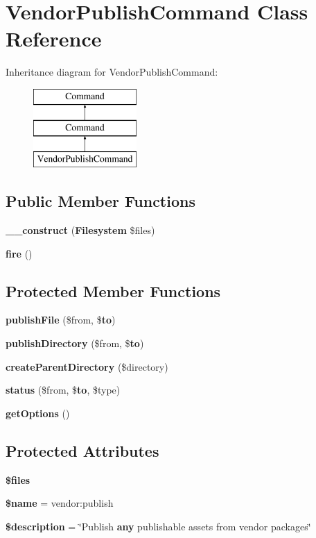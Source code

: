 \section{Vendor\+Publish\+Command Class Reference}
\label{class_illuminate_1_1_foundation_1_1_console_1_1_vendor_publish_command}
Inheritance diagram for Vendor\+Publish\+Command\+:\begin{figure}[H]
\begin{center}
\leavevmode
\includegraphics[height=3.000000cm]{class_illuminate_1_1_foundation_1_1_console_1_1_vendor_publish_command}
\end{center}
\end{figure}
\subsection*{Public Member Functions}
\begin{DoxyCompactItemize}
\item 
{\bf \+\_\+\+\_\+construct} ({\bf Filesystem} \$files)
\item 
{\bf fire} ()
\end{DoxyCompactItemize}
\subsection*{Protected Member Functions}
\begin{DoxyCompactItemize}
\item 
{\bf publish\+File} (\$from, \${\bf to})
\item 
{\bf publish\+Directory} (\$from, \${\bf to})
\item 
{\bf create\+Parent\+Directory} (\$directory)
\item 
{\bf status} (\$from, \${\bf to}, \$type)
\item 
{\bf get\+Options} ()
\end{DoxyCompactItemize}
\subsection*{Protected Attributes}
\begin{DoxyCompactItemize}
\item 
{\bf \$files}
\item 
{\bf \$name} = \textquotesingle{}vendor\+:publish\textquotesingle{}
\item 
{\bf \$description} = \char`\"{}Publish {\bf any} publishable assets from vendor packages\char`\"{}
\end{DoxyCompactItemize}


